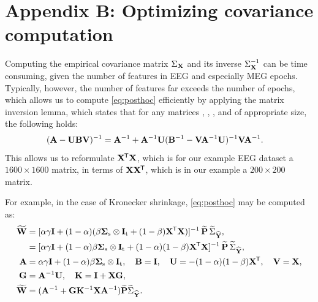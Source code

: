 \documentclass[a4paper]{vanvliet_paper}
\newcommand{\modpat}{\widetilde{\mat{P}}}
\newcommand{\modnorm}{\widetilde{\Sigma}_{\emat{Y}}}
\newcommand{\modweights}{\widetilde{\mat{W}}}
\begin{document}
\section*{Appendix B: Optimizing covariance computation}\label{appendixB}

Computing the empirical covariance matrix $\Sigma_{\mathbf{X}}$ and its inverse $\Sigma_{\mathbf{X}}^{-1}$ can be time consuming, given the number of features in \gls{EEG} and especially \gls{MEG} epochs.
Typically, however, the number of features far exceeds the number of epochs, which allows us to compute \autoref{eq:posthoc} efficiently by applying the matrix inversion lemma\cite{Tylavsky1986}, which states that for any matrices , , , and  of appropriate size, the following holds:
\begin{align}\label{eq:inversionlemma}
    (\mathbf{A} - \mathbf{U}\mathbf{B}\mathbf{V})^{-1} &= \mathbf{A}^{-1} + \mathbf{A}^{-1} \mathbf{U} ( \mathbf{B}^{-1} - \mathbf{V}\mathbf{A}^{-1}\mathbf{U} )^{-1} \mathbf{V} \mathbf{A}^{-1}.
\end{align}
This allows us to reformulate $\mathbf{X}^{\mkern-1.5mu\mathsf{T}}\mathbf{X}$, which is for our example \gls{EEG} dataset a $1600 \times 1600$ matrix, in terms of $\mathbf{X}\mathbf{X}^{\mkern-1.5mu\mathsf{T}}$, which is in our example a $200 \times 200$ matrix.

For example, in the case of Kronecker shrinkage, \autoref{eq:posthoc} may be computed as:
\begin{align}
    \modweights &= [\alpha \gamma \mat{I} + (1 - \alpha) (\beta \cov{\text{s}} \otimes \mat{I}_\text{t} + (1 - \beta) \mat{X}\trans\mat{X})]^{-1} \,\modpat\,\modnorm, \\
                &= [\alpha \gamma \mat{I} + (1 - \alpha) \beta \cov{\text{s}} \otimes \mat{I}_\text{t} + (1 - \alpha) (1 - \beta) \mat{X}\trans\mat{X}]^{-1} \,\modpat\,\modnorm, \\
    \mat{A} &= \alpha \gamma \mat{I} + (1 - \alpha) \beta \cov{\text{s}} \otimes \mat{I}_\text{t}, \hspace{1em}
    \mat{B} = \mat{I}, \hspace{1em}
    \mat{U} = -(1 - \alpha) (1 - \beta) \mat{X}\trans, \hspace{1em}
    \mat{V} = \mat{X}, \\
    \mat{G} &= \mat{A}^{-1}\mat{U}, \hspace{1em} \mat{K} = \mat{I} + \mat{X}\mat{G},\label{eq:K} \\
    \modweights &= (\mat{A}^{-1} + \mat{G}\mat{K}^{-1}\mat{X}\mat{A}^{-1})\modpat\modnorm.\label{eq:optim}
\end{align}
\end{document}
